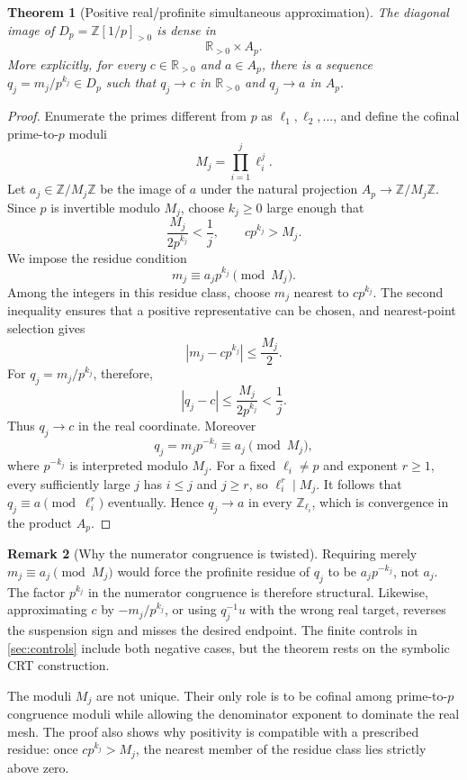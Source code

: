 \documentclass[11pt]{article}
\newtheorem{theorem}{Theorem}[section]
\theoremstyle{definition}
\newtheorem{remark}[theorem]{Remark}
\newcommand{\R}{\mathbb{R}}
\newcommand{\Z}{\mathbb{Z}}
\begin{document}
\begin{theorem}[Positive real/profinite simultaneous approximation]\label{thm:density}
The diagonal image of \(D_p=\Z[1/p]_{>0}\) is dense in
\[
 \R_{>0}\times A_p.
\]
More explicitly, for every \(c\in\R_{>0}\) and \(a\in A_p\), there is a sequence \(q_j=m_j/p^{k_j}\in D_p\) such that \(q_j\to c\) in \(\R_{>0}\) and \(q_j\to a\) in \(A_p\).
\end{theorem}

\begin{proof}
Enumerate the primes different from \(p\) as \(\ell_1,\ell_2,\ldots\), and define the cofinal prime-to-\(p\) moduli
\[
 M_j=\prod_{i=1}^{j}\ell_i^j.
\]
Let \(a_j\in\Z/M_j\Z\) be the image of \(a\) under the natural projection \(A_p\to\Z/M_j\Z\).  Since \(p\) is invertible modulo \(M_j\), choose \(k_j\ge0\) large enough that
\[
 \frac{M_j}{2p^{k_j}}<\frac1j,
 \qquad cp^{k_j}>M_j.
\]
We impose the residue condition
\[
 m_j\equiv a_jp^{k_j}\pmod{M_j}.
\]
Among the integers in this residue class, choose \(m_j\) nearest to \(cp^{k_j}\).  The second inequality ensures that a positive representative can be chosen, and nearest-point selection gives
\[
 |m_j-cp^{k_j}|\le \frac{M_j}{2}.
\]
For \(q_j=m_j/p^{k_j}\), therefore,
\[
 |q_j-c|\le\frac{M_j}{2p^{k_j}}<\frac1j.
\]
Thus \(q_j\to c\) in the real coordinate.  Moreover
\[
 q_j=m_jp^{-k_j}\equiv a_j\pmod{M_j},
\]
where \(p^{-k_j}\) is interpreted modulo \(M_j\).  For a fixed \(\ell_i\ne p\) and exponent \(r\ge1\), every sufficiently large \(j\) has \(i\le j\) and \(j\ge r\), so \(\ell_i^r\mid M_j\).  It follows that \(q_j\equiv a\pmod{\ell_i^r}\) eventually.  Hence \(q_j\to a\) in every \(\Z_{\ell_i}\), which is convergence in the product \(A_p\).
\end{proof}

\begin{remark}[Why the numerator congruence is twisted]\label{rem:twist}
Requiring merely \(m_j\equiv a_j\pmod{M_j}\) would force the profinite residue of \(q_j\) to be \(a_jp^{-k_j}\), not \(a_j\).  The factor \(p^{k_j}\) in the numerator congruence is therefore structural.  Likewise, approximating \(c\) by \(-m_j/p^{k_j}\), or using \(q_j^{-1}u\) with the wrong real target, reverses the suspension sign and misses the desired endpoint.  The finite controls in \cref{sec:controls} include both negative cases, but the theorem rests on the symbolic CRT construction.
\end{remark}

The moduli \(M_j\) are not unique.  Their only role is to be cofinal among prime-to-\(p\) congruence moduli while allowing the denominator exponent to dominate the real mesh.  The proof also shows why positivity is compatible with a prescribed residue: once \(cp^{k_j}>M_j\), the nearest member of the residue class lies strictly above zero.
\end{document}
